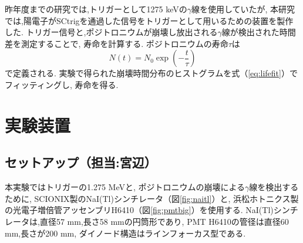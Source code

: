 昨年度までの研究では,トリガーとして1275 keVの$\gamma$線を使用していたが,
本研究では,陽電子がSCtrigを通過した信号をトリガーとして用いるための装置を製作した.
トリガー信号と,ポジトロニウムが崩壊し放出される$\gamma$線が検出された時間差を測定することで,
寿命を計算する.
ポジトロニウムの寿命$\tau$は
\begin{equation}
N(t) = N_{0} \exp( - \frac{t}{\tau})
\label{eq:lifefit}
\end{equation}
で定義される.
実験で得られた崩壊時間分布のヒストグラムを式（\ref{eq:lifefit}）でフィッティングし,
寿命を得る.


\section{実験装置}

\subsection{セットアップ（担当:宮辺）}

本実験ではトリガーの1.275 MeVと,
ポジトロニウムの崩壊による$\gamma$線を検出するために,
SCIONIX製のNaI(Tl)シンチレータ（図\ref{fig:naitl}）と,
浜松ホトニクス製の光電子増倍管アッセンブリH6410（図\ref{fig:pmtbig}）を使用する.
NaI(Tl)シンチレータは,直径57 mm,長さ58 mmの円筒形であり,
PMT H6410の管径は直径60 mm,長さが200 mm,
ダイノード構造はラインフォーカス型である.

